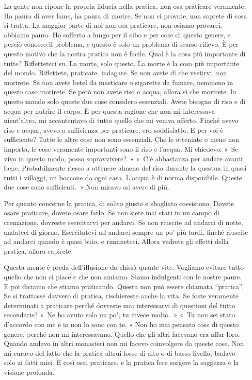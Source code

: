 La gente non ripone la propria fiducia nella pratica, non osa praticare
veramente. Ha paura di aver fame, ha paura di morire. Se non ci provate,
non saprete di cosa si tratta. La maggior parte di noi non osa
praticare, non osiamo provarci, abbiamo paura. Ho sofferto a lungo per
il cibo e per cose di questo genere, e perciò conosco il problema, e
questo è solo un problema di scarso rilievo. È per questo motivo che la
nostra pratica non è facile. Qual è la cosa più importante di tutte?
Rifletteteci su. La morte, solo questo. La morte è la cosa più
importante del mondo. Riflettete, praticate, indagate. Se non avete di
che vestirvi, non morirete. Se non avete betel da masticare o sigarette
da fumare, nemmeno in questo caso morirete. Se però non avete riso o
acqua, allora sì che morirete. In questo mondo solo queste due cose
considero essenziali. Avete bisogno di riso e di acqua per nutrire il
corpo. È per questa ragione che non mi interessava nient'altro, mi
accontentavo di tutto quello che mi veniva offerto. Finché avevo riso e
acqua, avevo a sufficienza per praticare, ero soddisfatto. E per voi è
sufficiente? Tutte le altre cose non sono essenziali. Che le otteniate o
meno non importa, le cose veramente importanti sono il riso e l'acqua.
Mi chiedevo: «~Se vivo in questo modo, posso sopravvivere?~» «~C'è
abbastanza per andare avanti bene. Probabilmente riesco a ottenere
almeno del riso durante la questua in quasi tutti i villaggi, un boccone
da ogni casa. L'acqua è di norma disponibile. Queste due cose sono
sufficienti.~» Non miravo ad avere di più.

Per quanto concerne la pratica, di solito giusto e sbagliato coesistono.
Dovete osare praticare, dovete osare farlo. Se non siete mai stati in un
campo di cremazione, dovreste esercitarvi per andarci. Se non riuscite
ad andarci di notte, andateci di giorno. Esercitatevi ad andarci sempre
un po' più tardi, finché riuscite ad andarci quando è quasi buio, e
rimaneteci. Allora vedrete gli effetti della pratica, allora capirete.

Questa mente è preda dell'illusione da chissà quante vite. Vogliamo
evitare tutto quello che non ci piace e che non amiamo. Siamo indulgenti
con le nostre paure. E poi diciamo che stiamo praticando. Questa non può
essere chiamata ``pratica''. Se si trattasse davvero di pratica,
rischiereste anche la vita. Se foste veramente determinati a praticare
perché dovreste mai interessarvi di questioni del tutto secondarie? «~Ne
ho avuto solo un po', tu invece molto.~» «~Tu non sei stato d'accordo
con me e io non lo sono con te. » Non ho mai pensato cose di questo
genere, perché non mi interessavano. Quello che gli altri facevano era
affar loro. Quando andavo in altri monasteri non mi facevo coinvolgere
da queste cose. Non mi curavo del fatto che la pratica altrui fosse di
alto o di basso livello, badavo solo ai fatti miei. E così osai
praticare, e la pratica fece sorgere la saggezza e la visione profonda.

